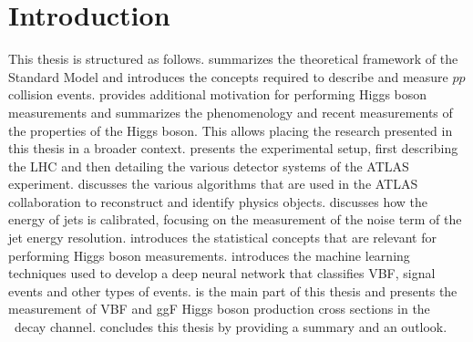 \chapter{Introduction}
\label{chap:introduction}




\quad \newline

\noindent This thesis is structured as follows.  summarizes the theoretical framework of the Standard Model and introduces the concepts required to describe and measure $pp$ collision events.
 provides additional motivation for performing Higgs boson measurements and summarizes the phenomenology and recent measurements of the properties of the Higgs boson. This allows placing the research presented in this thesis in a broader context.
 presents the experimental setup, first describing the LHC and then detailing the various detector systems of the ATLAS experiment.
 discusses the various algorithms that are used in the ATLAS collaboration to reconstruct and identify physics objects.
 discusses how the energy of jets is calibrated, focusing on the measurement of the noise term of the jet energy resolution.
 introduces the statistical concepts that are relevant for performing Higgs boson measurements.
 introduces the machine learning techniques used to develop a deep neural network that classifies VBF, \HWW signal events and other types of events.
 is the main part of this thesis and presents the measurement of VBF and ggF Higgs boson production cross sections in the \HWW\ decay channel.
 concludes this thesis by providing a summary and an outlook.






